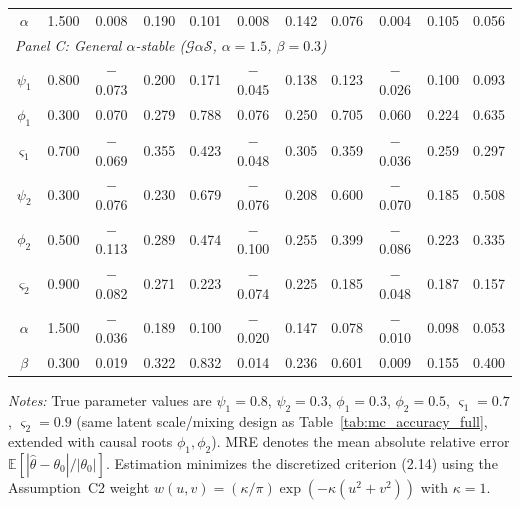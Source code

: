\begin{table}[!h]
\begin{tabular}{ccccccccccc}
$\alpha$ & 1.500 & 0.008 & 0.190 & 0.101 & 0.008 & 0.142 & 0.076 & 0.004 & 0.105 & 0.056 \\[6pt]
\multicolumn{11}{l}{\textit{Panel C: General $\alpha$-stable ($\mathcal{G}\alpha\mathcal{S}$, $\alpha = 1.5$, $\beta = 0.3$)}} \\[3pt]
$\psi_1$ & 0.800 & $-$0.073 & 0.200 & 0.171 & $-$0.045 & 0.138 & 0.123 & $-$0.026 & 0.100 & 0.093 \\
$\phi_1$ & 0.300 & 0.070 & 0.279 & 0.788 & 0.076 & 0.250 & 0.705 & 0.060 & 0.224 & 0.635 \\
$\varsigma_{1}$ & 0.700 & $-$0.069 & 0.355 & 0.423 & $-$0.048 & 0.305 & 0.359 & $-$0.036 & 0.259 & 0.297 \\
$\psi_2$ & 0.300 & $-$0.076 & 0.230 & 0.679 & $-$0.076 & 0.208 & 0.600 & $-$0.070 & 0.185 & 0.508 \\
$\phi_2$ & 0.500 & $-$0.113 & 0.289 & 0.474 & $-$0.100 & 0.255 & 0.399 & $-$0.086 & 0.223 & 0.335 \\
$\varsigma_{2}$ & 0.900 & $-$0.082 & 0.271 & 0.223 & $-$0.074 & 0.225 & 0.185 & $-$0.048 & 0.187 & 0.157 \\
$\alpha$ & 1.500 & $-$0.036 & 0.189 & 0.100 & $-$0.020 & 0.147 & 0.078 & $-$0.010 & 0.098 & 0.053 \\
$\beta$ & 0.300 & 0.019 & 0.322 & 0.832 & 0.014 & 0.236 & 0.601 & 0.009 & 0.155 & 0.400 \\
\bottomrule
\end{tabular}
\begin{flushleft}
\footnotesize\textit{Notes:} True parameter values are $\psi_1 = 0.8$, $\psi_2 = 0.3$, $\phi_1 = 0.3$, $\phi_2 = 0.5$, $\varsigma_1 = 0.7$, $\varsigma_2 = 0.9$ (same latent scale/mixing design as Table~\ref{tab:mc_accuracy_full}, extended with causal roots $\phi_1,\phi_2$).  MRE denotes the mean absolute relative error $\mathbb{E}[|\hat\theta - \theta_0|/|\theta_0|]$.  Estimation minimizes the discretized criterion (2.14) using the Assumption~C2 weight $w(u,v)=(\kappa/\pi)\exp(-\kappa(u^2+v^2))$ with $\kappa=1$.
\end{flushleft}
\end{table}
